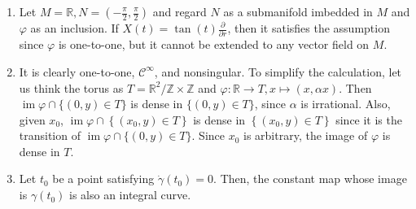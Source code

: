 \begin{enumerate}
(1.60$\Rightarrow$1.61) Let $X_{i}=\frac{\partial}{\partial r_{i}}+\sum_{j=1}^{n} b_{ji} \frac{\partial}{\partial s_{j}}$ for $1 \leq i \leq n$ and $\mathcal{D}$ be a distribution generated by $X_{i}$'s. 
Then by similar calculation above, $\left[X_{a}, X_{b}\right]=0 \in \mathcal{D}$ by assumption 1.61 (2). 
Thus by 1.60, there exists a cubic coordinate system $(W, \varphi)$ with coordinate functions $\left(x_{1}, \ldots, x_{m}, y_{1}, \ldots, y_{n}\right)$ defined as the theorem. 
Let us define $\alpha$ on the neighborhood of $(0,0)$ s.t. $y_{j}(r, \alpha_{s}(r))=y_{j}(r_{0}, s), \forall 1 \leq j \leq n$ by implicit function theorem. 
We can define this because $X_{1}, \ldots, X_{m}, \frac{\partial}{\partial s_{1}}, \ldots, \frac{\partial}{\partial s_{1}}$ is a basis of tangent space and $X_{i}(y_{j})=0$ since $y_{j}$'s are constant on integral manifolds of $\mathcal{D}$, 
which means $\left\{\frac{\partial y_{j}}{\partial s_{k}}\right\}$ should be nonsingular. 
Then clearly $\alpha_{s}(r_{0})=s$ and
\[\frac{\partial y_{j}}{\partial r_{i}}+\sum_{k=1}^{n} \frac{\partial y_{j}}{\partial s_{k}} \frac{\partial \alpha_{s, k}}{\partial r_{i}}=0.\]
Also, $X_{i}(y_{j})=0$ means
\[\frac{\partial y_{j}}{\partial r_{i}}+\sum_{k=1}^{n} b_{ki} \frac{\partial y_{j}}{\partial s_{k}}=0.\]
Since $\left\{\frac{\partial y_{j}}{\partial s_{k}}\right\}$ is nonsingular, condition (4) is satisfied.
\item Let $M=\mathbb{R}, N=\left(-\frac{\pi}{2}, \frac{\pi}{2}\right)$ and regard $N$ as a submanifold imbedded in $M$ and $\varphi$ as an inclusion. 
If $X(t)=\tan (t) \frac{\partial}{\partial r}$, then it satisfies the assumption since $\varphi$ is one-to-one, but it cannot be extended to any vector field on $M$.
\item It is clearly one-to-one, $\mathcal{C}^{\infty}$, and nonsingular. 
To simplify the calculation, let us think the torus as $T=\mathbb{R}^{2} / \mathbb{Z} \times \mathbb{Z}$ and $\varphi\colon \mathbb{R} \rightarrow T, x \mapsto(x, \alpha x)$. 
Then $\operatorname{im} \varphi \cap\{(0, y) \in T\}$ is dense in $\{(0, y) \in T\}$, since $\alpha$ is irrational. 
Also, given $x_{0}$, $\operatorname{im} \varphi \cap\left\{\left(x_{0}, y\right) \in T\right\}$ is dense in $\left\{\left(x_{0}, y\right) \in T\right\}$ since it is the transition of $\operatorname{im} \varphi \cap\{(0, y) \in T\}$. 
Since $x_{0}$ is arbitrary, the image of $\varphi$ is dense in $T$.
\item Let $t_{0}$ be a point satisfying $\dot{\gamma}(t_{0})=0$. 
Then, the constant map whose image is $\gamma(t_{0})$ is also an integral curve. 

\end{enumerate}
